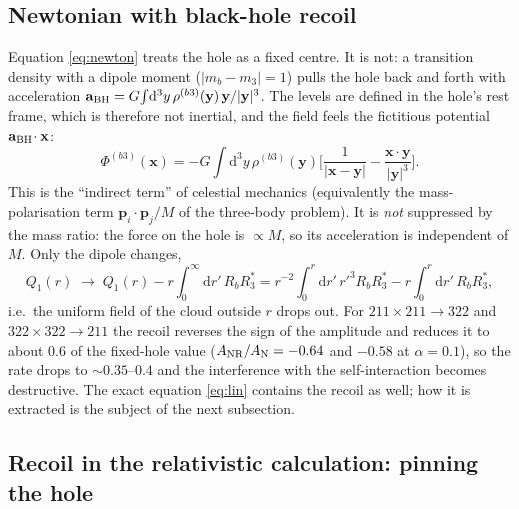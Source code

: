 \documentclass[11pt]{article}
\newcommand{\bx}{\mathbf{x}}\newcommand{\by}{\mathbf{y}}
\newcommand{\dd}{\mathrm{d}}
\begin{document}
\subsection{Newtonian with black-hole recoil}
Equation \eqref{eq:newton} treats the hole as a fixed centre. It is not: a transition density with a dipole moment
($|m_b-m_3|=1$) pulls the hole back and forth with acceleration $\mathbf{a}_{\rm BH}=G\!\int\!\dd^3y\,\rho^{(b3)}(\by)\,\by/|\by|^3$.
The levels are defined in the hole's rest frame, which is therefore not inertial, and the field feels the fictitious potential
$\mathbf{a}_{\rm BH}\!\cdot\bx$:
\begin{equation}
\Phi^{(b3)}(\bx)=-G\!\int\!\dd^3y\,\rho^{(b3)}(\by)\Big[\frac{1}{|\bx-\by|}-\frac{\bx\cdot\by}{|\by|^3}\Big].
\end{equation}
This is the ``indirect term'' of celestial mechanics (equivalently the mass-polarisation term $\mathbf p_i\!\cdot\!\mathbf p_j/M$ of the
three-body problem). It is \emph{not} suppressed by the mass ratio: the force on the hole is $\propto M$, so its acceleration is
independent of $M$. Only the dipole changes,
\begin{equation}
Q_1(r)\;\to\;Q_1(r)-r\!\int_0^\infty\!\dd r'\,R_bR_3^*=r^{-2}\!\!\int_0^r\!\dd r'\,r'^3R_bR_3^*-r\!\int_0^r\!\dd r'\,R_bR_3^* ,
\end{equation}
i.e.\ the uniform field of the cloud outside $r$ drops out. For $211\times211\to322$ and $322\times322\to211$ the recoil reverses the sign
of the amplitude and reduces it to about $0.6$ of the fixed-hole value ($A_{\rm NR}/A_{\rm N}=-0.64$ and $-0.58$ at $\alpha=0.1$),
so the rate drops to $\sim0.35$--$0.4$ and the interference with the self-interaction becomes destructive.
The exact equation \eqref{eq:lin} contains the recoil as well; how it is extracted is the subject of the next subsection.

\subsection{Recoil in the relativistic calculation: pinning the hole}\label{sec:pin}
\end{document}
